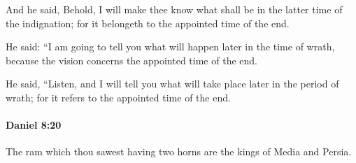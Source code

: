 			\begin{versebox}
					\item[BHS] 
					\item[LXX] 
					\item[ASV] And he said, Behold, I will make thee know what shall be in the latter time of the indignation; for it belongeth to the appointed time of the end.
					\item[NIV] He said: “I am going to tell you what will happen later in the time of wrath, because the vision concerns the appointed time of the end.
					\item[NRSV] He said, “Listen, and I will tell you what will take place later in the period of wrath; for it refers to the appointed time of the end.
			\end{versebox}

		\paragraph{Daniel 8:20} %
			\label{DANIEL-8-20}

			The ram which thou sawest having two horns are the kings of Media and Persia.

